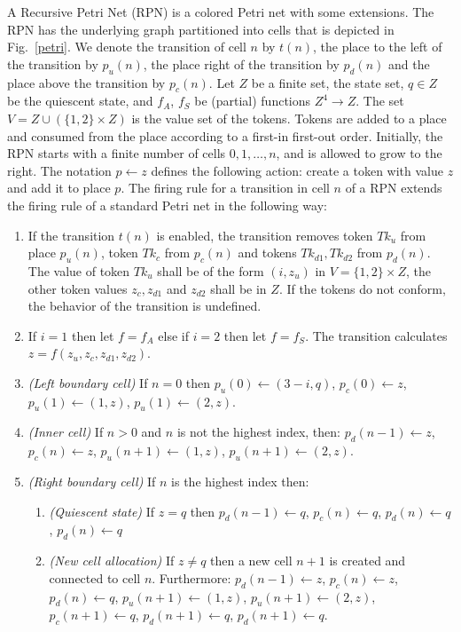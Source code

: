 \documentclass[pre,amssymb,showpacs,showkeys,preprint]{revtex4}
\begin{document}
A Recursive Petri Net (RPN) is a colored Petri net with some extensions.
The RPN  has the underlying graph partitioned into cells that is depicted in Fig.~\ref{petri}.
We denote the transition of cell $n$ by $t(n)$, the place to the left of the transition by
$p_u(n)$, the place right of the transition by $p_d(n)$ and the place above the transition by $p_c(n)$.
Let $Z$ be a finite set, the state set, $q \in Z$ be the quiescent state, and $f_A$, $f_S$ be (partial) functions $Z^4 \rightarrow Z$.
The set $V=Z \cup (\{1,2\} \times Z)$ is the value set of the tokens.
Tokens are added to a place and consumed from the place according to a first-in first-out order.
Initially, the RPN starts with a finite number of cells $0, 1, \ldots, n$, and is allowed to grow to the right.
The notation $p \leftarrow z$ defines the following action:
create a token with value $z$ and add it to place $p$.
The firing rule for a transition in cell $n$ of a RPN extends the firing rule of a standard Petri net in the following way:
\begin{enumerate}
\item If the transition $t(n)$ is enabled, the transition
removes token $\mathit{Tk}_u$ from place $p_u(n)$, token $\mathit{Tk}_c$ from $p_c(n)$ and
tokens $\mathit{Tk}_{d1}, \mathit{Tk}_{d2}$ from $p_d(n)$.
The value of token $\mathit{Tk}_{u}$ shall be of the form $(i, z_u)$ in $V=\{1,2\} \times Z$,
the other token values $z_c, z_{d1}$ and $z_{d2}$ shall be in $Z$.
If the tokens do not conform, the behavior of the transition is undefined.
\item
If $i = 1$ then let $f = f_A$ else if $i = 2$ then let $f = f_S$.
The transition calculates $z = f(z_u, z_c, z_{d1}, z_{d2})$.
\item
\emph{(Left boundary cell)}
If $n = 0$ then
$p_u(0) \leftarrow (3 - i, q)$, $p_c(0) \leftarrow z$, $p_u(1) \leftarrow (1, z)$, $p_u(1) \leftarrow (2,z)$.
\item
\emph{(Inner cell)}
If $n > 0$ and $n$ is not the highest index, then:
$p_d(n-1) \leftarrow z$, $p_c(n) \leftarrow z$, $p_u(n+1) \leftarrow (1, z)$, $p_u(n+1) \leftarrow (2, z)$.
\item \emph{(Right boundary cell)}
If $n$ is the highest index then:
\begin{enumerate}
\item \emph{(Quiescent state)}
\label{firing-rule-quiescent}
If $z = q$ then
$p_d(n-1) \leftarrow q$, $p_c(n) \leftarrow q$, $p_d(n) \leftarrow q$, $p_d(n) \leftarrow q$
\item \emph{(New cell allocation)}
If $z \neq q$ then a new cell $n + 1$ is created and connected to cell $n$.
Furthermore: $p_d(n-1) \leftarrow z$, $p_c(n) \leftarrow z$, $p_d(n) \leftarrow q$,
$p_u(n+1) \leftarrow (1, z)$, $p_u(n+1) \leftarrow (2, z)$,
$p_c(n + 1) \leftarrow q$, $p_d(n + 1) \leftarrow q$, $p_d(n + 1) \leftarrow q$.
\end{enumerate}
\end{enumerate}
\end{document}
